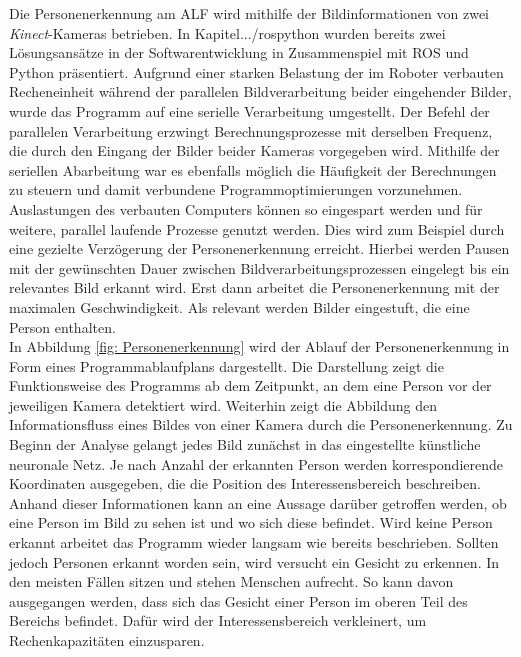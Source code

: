 	Die Personenerkennung am ALF wird mithilfe der Bildinformationen von zwei \textit{Kinect}-Kameras betrieben. In Kapitel.../rospython wurden bereits zwei Lösungsansätze in der Softwarentwicklung in Zusammenspiel mit ROS und Python präsentiert. Aufgrund einer starken Belastung der im Roboter verbauten Recheneinheit während der parallelen Bildverarbeitung beider eingehender Bilder, wurde das Programm auf eine serielle Verarbeitung umgestellt. Der Befehl der parallelen Verarbeitung erzwingt Berechnungsprozesse mit derselben Frequenz, die durch den Eingang der Bilder beider Kameras vorgegeben wird. Mithilfe der seriellen Abarbeitung  war es ebenfalls möglich die Häufigkeit der Berechnungen zu steuern und damit verbundene Programmoptimierungen vorzunehmen. Auslastungen des verbauten Computers können so eingespart werden und für weitere, parallel laufende Prozesse genutzt werden. Dies wird zum Beispiel durch eine gezielte Verzögerung der Personenerkennung erreicht. Hierbei werden Pausen mit der gewünschten Dauer zwischen Bildverarbeitungsprozessen eingelegt bis ein relevantes Bild erkannt wird. Erst dann arbeitet die Personenerkennung mit der maximalen Geschwindigkeit. Als relevant werden Bilder eingestuft, die eine Person enthalten.\\
	
	In Abbildung \ref{fig: Personenerkennung} wird der Ablauf der Personenerkennung in Form eines Programmablaufplans dargestellt. Die Darstellung zeigt die Funktionsweise des Programms ab dem Zeitpunkt, an dem eine Person vor der jeweiligen Kamera detektiert wird. Weiterhin zeigt die Abbildung den Informationsfluss eines Bildes von einer Kamera durch die Personenerkennung. Zu Beginn der Analyse gelangt jedes Bild zunächst in das eingestellte künstliche neuronale Netz. Je nach Anzahl der erkannten Person werden korrespondierende Koordinaten ausgegeben, die die Position des Interessensbereich beschreiben. Anhand dieser Informationen kann an eine Aussage darüber getroffen werden, ob eine Person im Bild zu sehen ist und wo sich diese befindet. Wird keine Person erkannt arbeitet das Programm wieder langsam wie bereits beschrieben. Sollten jedoch Personen erkannt worden sein, wird versucht ein Gesicht zu erkennen. In den meisten Fällen sitzen und stehen Menschen aufrecht. So kann davon ausgegangen werden, dass sich das Gesicht einer Person im oberen Teil des Bereichs befindet. Dafür wird der Interessensbereich verkleinert, um Rechenkapazitäten einzusparen. 
	  
